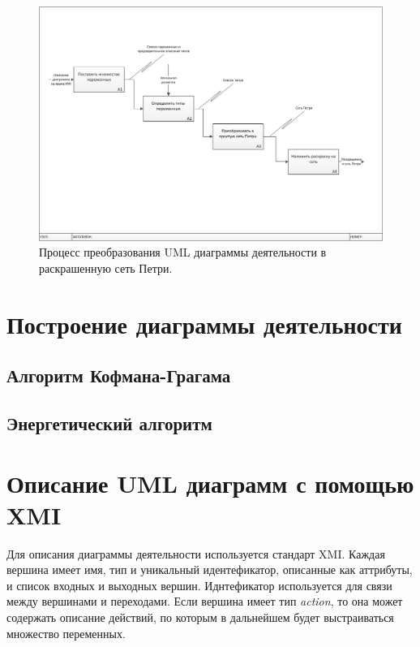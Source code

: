 \begin{figure}
	\begin{center}
		\includegraphics[width=\textwidth]{include/IDEF0ColouredPetri.png}
	\end{center}
	\caption{Процесс преобразования UML диаграммы деятельности в раскрашенную сеть Петри.}
	\label{fig:fig2}
\end{figure}

\section{Построение диаграммы деятельности}

\subsection{Алгоритм Кофмана-Грагама}

\subsection{Энергетический алгоритм}

\section{Описание UML диаграмм с помощью XMI}

Для описания диаграммы деятельности используется стандарт XMI. Каждая вершина имеет имя, тип и уникальный идентефикатор, описанные как аттрибуты, и список входных и выходных вершин. Иднтефикатор используется для связи между вершинами и переходами. Если вершина имеет тип \textit{action}, то она может содержать описание действий, по которым в дальнейшем будет выстраиваться множество переменных.

